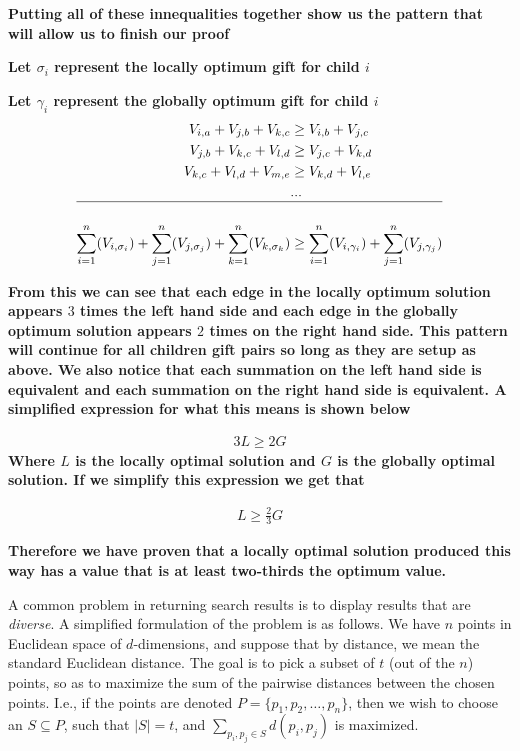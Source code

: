 \documentclass[addpoints]{exam}
\def\mysolution#1{}    %
\begin{document}
\begin{questions}
\textbf{Putting all of these innequalities together show us the pattern that will allow us to finish our proof}

\textbf{Let $\sigma_i$ represent the locally optimum gift for child $i$}

\textbf{Let $\gamma_i$ represent the globally optimum gift for child $i$}
\begin{align}
    V_{i,a} + V_{j,b} + V_{k,c} &\ge V_{i,b} + V_{j,c} \\
    V_{j,b} + V_{k,c} + V_{l,d} &\ge V_{j,c} + V_{k,d} \\ 
    V_{k,c} + V_{l,d} + V_{m,e} &\ge V_{k,d} + V_{l,e} \\ 
    & ... \\
    \hline \\  
    \sum_{i=1}^{n}(V_{i,\sigma_i}) + \sum_{j=1}^{n}(V_{j,\sigma_j}) + \sum_{k=1}^{n}(V_{k,\sigma_k}) &\ge \sum_{i=1}^{n}(V_{i,\gamma_i}) + \sum_{j=1}^{n}(V_{j,\gamma_j}) 
\end{align}

\textbf{From this we can see that each edge in the locally optimum solution appears $3$ times the left hand side and each edge in the globally optimum solution appears $2$ times on the right hand side. This pattern will continue for all children gift pairs so long as they are setup as above. We also notice that each summation on the left hand side is equivalent and each summation on the right hand side is equivalent. A simplified expression for what this means is shown below}

\begin{align}
    3L \ge 2G
\end{align}
\textbf{Where $L$ is the locally optimal solution and $G$ is the globally optimal solution. If we simplify this expression we get that}

\begin{align}
    L \ge \frac{2}{3}G
\end{align}

\textbf{Therefore we have proven that a locally optimal solution produced this way has a value that is at least two-thirds the optimum value.}
\mysolution{
    
}



A common problem in returning search results is to display results that are {\em diverse}. A simplified formulation of the problem is as follows. We have $n$ points in Euclidean space of $d$-dimensions, and suppose that by distance, we mean the standard Euclidean distance. The goal is to pick a subset of $t$ (out of the $n$) points, so as to maximize the sum of the pairwise distances between the chosen points. 
I.e., if the points are denoted $P = \{p_1, p_2, \dots, p_n\}$, then we wish to choose an $S \subseteq P$, such that $|S| = t$, and $\sum_{p_i, p_j \in S} d(p_i, p_j)$ is maximized.


\end{questions}
\end{document}
